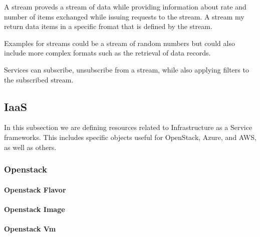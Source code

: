 \documentclass[10pt]{article}
\begin{document}
A stream proveds a stream of data while providing information about
rate and number of items exchanged while issuing requests to the
stream. A stream my return data items in a specific fromat that is
defined by the stream. 


Examples for streams could be a stream of random numbers but could
also include more complex formats such as the retrieval of data
records. 

Services can subscribe, unsubscribe from a stream, while also applying
filters to the subscribed stream.



\subsection{IaaS}

In this subsection we are defining resources related to Infrastructure as
a Service frameworks. This includes specific objects useful for
OpenStack, Azure, and AWS, as well as others.

\subsubsection{Openstack}

\paragraph{Openstack Flavor}


\paragraph{Openstack Image}


\paragraph{Openstack Vm}
\end{document}
